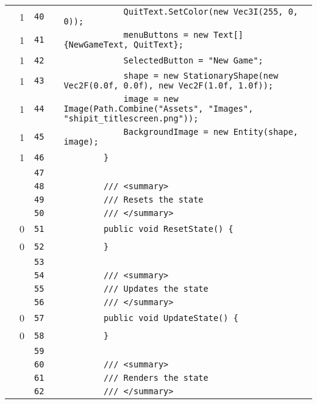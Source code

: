 \documentclass[a4paper,landscape,10pt]{article}
\begin{document}
\begin{longtable}[l]{lrrll}
\cellcolor{green} & 1 & \verb~40~ & & \verb~            QuitText.SetColor(new Vec3I(255, 0, 0));~\\
\cellcolor{green} & 1 & \verb~41~ & & \verb~            menuButtons = new Text[] {NewGameText, QuitText};~\\
\cellcolor{green} & 1 & \verb~42~ & & \verb~            SelectedButton = "New Game";~\\
\cellcolor{green} & 1 & \verb~43~ & & \verb~            shape = new StationaryShape(new Vec2F(0.0f, 0.0f), new Vec2F(1.0f, 1.0f));~\\
\cellcolor{green} & 1 & \verb~44~ & & \verb~            image = new Image(Path.Combine("Assets", "Images", "shipit_titlescreen.png"));~\\
\cellcolor{green} & 1 & \verb~45~ & & \verb~            BackgroundImage = new Entity(shape, image);~\\
\cellcolor{green} & 1 & \verb~46~ & & \verb~        }~\\
\cellcolor{gray} &  & \verb~47~ & & \verb~~\\
\cellcolor{gray} &  & \verb~48~ & & \verb~        /// <summary>~\\
\cellcolor{gray} &  & \verb~49~ & & \verb~        /// Resets the state~\\
\cellcolor{gray} &  & \verb~50~ & & \verb~        /// </summary>~\\
\cellcolor{red} & 0 & \verb~51~ & & \verb~        public void ResetState() {~\\
\cellcolor{red} & 0 & \verb~52~ & & \verb~        }~\\
\cellcolor{gray} &  & \verb~53~ & & \verb~~\\
\cellcolor{gray} &  & \verb~54~ & & \verb~        /// <summary>~\\
\cellcolor{gray} &  & \verb~55~ & & \verb~        /// Updates the state~\\
\cellcolor{gray} &  & \verb~56~ & & \verb~        /// </summary>~\\
\cellcolor{red} & 0 & \verb~57~ & & \verb~        public void UpdateState() {~\\
\cellcolor{red} & 0 & \verb~58~ & & \verb~        }~\\
\cellcolor{gray} &  & \verb~59~ & & \verb~~\\
\cellcolor{gray} &  & \verb~60~ & & \verb~        /// <summary>~\\
\cellcolor{gray} &  & \verb~61~ & & \verb~        /// Renders the state~\\
\cellcolor{gray} &  & \verb~62~ & & \verb~        /// </summary>~\\

\end{longtable}
\end{document}
